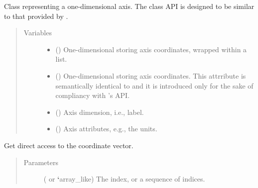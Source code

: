 \documentclass[letterpaper,10pt,english]{sphinxmanual}
\begin{document}
\begin{fulllineitems}
\label{\detokenize{api:grids.axis.Axis}}
Class representing a one-dimensional axis. The class API is designed to be similar to
that provided by .
\begin{quote}\begin{description}
\item[{Variables}] \leavevmode\begin{itemize}
\item {} 
 () \textendash{} One-dimensional  storing axis coordinates, wrapped within a list.

\item {} 
 () \textendash{} One-dimensional  storing axis coordinates. This attrribute is semantically identical
to  and it is introduced only for the sake of compliancy with ’s API.

\item {} 
 () \textendash{} Axis dimension, i.e., label.

\item {} 
 () \textendash{} Axis attributes, e.g., the units.

\end{itemize}

\end{description}\end{quote}

\begin{fulllineitems}
\label{\detokenize{api:grids.axis.Axis.__getitem__}}
Get direct access to the coordinate vector.
\begin{quote}\begin{description}
\item[{Parameters}] \leavevmode
{} ( or {\color{red}\bfseries{}{}`}array\_like) \textendash{} The index, or a sequence of indices.


\end{description}
\end{quote}
\end{fulllineitems}
\end{fulllineitems}
\end{document}
